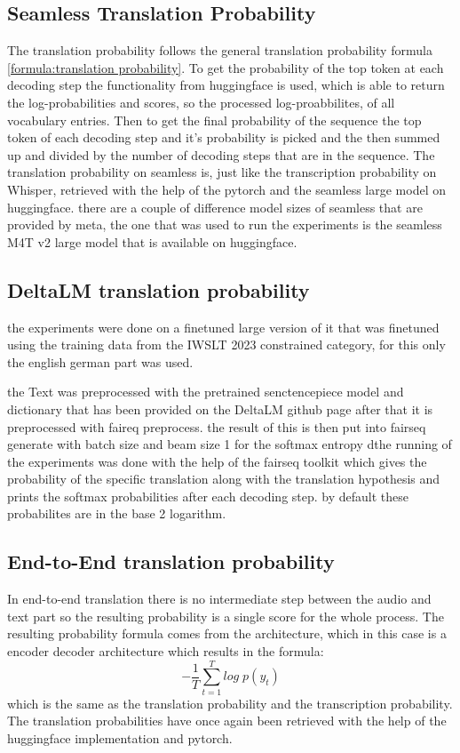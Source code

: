 \subsection{Seamless Translation Probability}
The translation probability follows the general translation probability formula \autoref{formula:translation probability}. To get the probability of the top token at each decoding step the functionality from huggingface is used, which is able to return the log-probabilities and scores, so the processed log-proabbilites, of all vocabulary entries. 
Then to get the final probability of the sequence the top token of each decoding step and it's probability is picked and the then summed up and divided by the number of decoding steps that are in the sequence.
The translation probability on seamless is, just like the transcription probability on Whisper, retrieved with the help of the pytorch and the seamless large model on huggingface. 
there are a couple of difference model sizes of seamless that are provided by meta, the one that was used to run the experiments is the seamless M4T v2 large model that is available on huggingface. 

\subsection{DeltaLM translation probability}
the experiments \cite{ma2021deltalm} were done on a finetuned large version of it that was finetuned using the training data from the IWSLT 2023 constrained category, for this only the english german part was used.

the Text was preprocessed with the pretrained senctencepiece model and dictionary that has been provided on the DeltaLM github page \cite{deltalmurl} after that it is preprocessed with faireq preprocess. the result of this is then put into fairseq generate with batch size and beam size 1 for the softmax entropy 
 dthe running of the experiments was done with the help of the fairseq toolkit \cite{ott2019fairseqfastextensibletoolkit} which gives the probability of the specific translation along with the translation hypothesis and prints the softmax probabilities after each decoding step. by default these probabilites are in the base 2 logarithm. 

\subsection{End-to-End translation probability}
In end-to-end translation there is no intermediate step between the audio and text part so the resulting probability is a single score for the whole process.
The resulting probability formula comes from the architecture, which in this case is a encoder decoder architecture which results in the formula: $$-\frac{1}{T}\sum_{t=1}^T log\; p(y_t)$$ which is the same as the translation probability and the transcription probability.
The translation probabilities have once again been retrieved with the help of the huggingface implementation and pytorch. 

